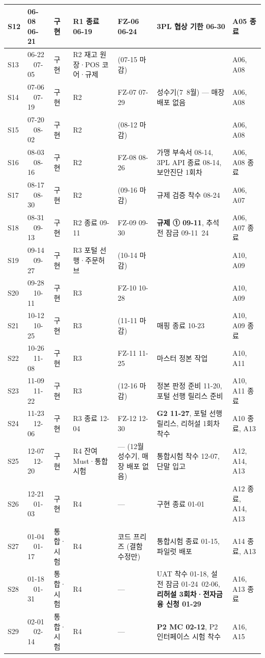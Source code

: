 \documentclass[10pt,a4paper]{article}
\begin{document}
{\begin{longtable}{|C{9mm}|L{24mm}|L{16mm}|L{44mm}|L{40mm}|L{76mm}|L{40mm}|}
S12 & 06-08 ~ 06-21 & 구현 & R1 종료 06-19 & FZ-06 06-24 & 3PL 협상 기한 06-30 & A05 종료 \\ \hline
S13 & 06-22 ~ 07-05 & 구현 & R2 재고 원장·POS 코어·규제 & (07-15 마감) & & A06, A08 \\ \hline
S14 & 07-06 ~ 07-19 & 구현 & R2 & FZ-07 07-29 & 성수기(7~8월) — 매장 배포 없음 & A06, A08 \\ \hline
S15 & 07-20 ~ 08-02 & 구현 & R2 & (08-12 마감) & & A06, A08 \\ \hline
S16 & 08-03 ~ 08-16 & 구현 & R2 & FZ-08 08-26 & 가맹 부속서 08-14, 3PL API 종료 08-14, 보안진단 1회차 & A06, A08 종료 \\ \hline
S17 & 08-17 ~ 08-30 & 구현 & R2 & (09-16 마감) & 규제 검증 착수 08-24 & A06, A07 \\ \hline
S18 & 08-31 ~ 09-13 & 구현 & R2 종료 09-11 & FZ-09 09-30 & \textbf{규제 ① 09-11}, 추석 전 잠금 09-11~24 & A06, A07 종료 \\ \hline
S19 & 09-14 ~ 09-27 & 구현 & R3 포털 선행·주문허브 & (10-14 마감) & & A10, A09 \\ \hline
S20 & 09-28 ~ 10-11 & 구현 & R3 & FZ-10 10-28 & & A10, A09 \\ \hline
S21 & 10-12 ~ 10-25 & 구현 & R3 & (11-11 마감) & 매핑 종료 10-23 & A10, A09 종료 \\ \hline
S22 & 10-26 ~ 11-08 & 구현 & R3 & FZ-11 11-25 & 마스터 정본 작업 & A10, A11 \\ \hline
S23 & 11-09 ~ 11-22 & 구현 & R3 & (12-16 마감) & 정본 판정 준비 11-20, 포털 선행 릴리스 준비 & A10, A11 종료 \\ \hline
S24 & 11-23 ~ 12-06 & 구현 & R3 종료 12-04 & FZ-12 12-30 & \textbf{G2 11-27}, 포털 선행 릴리스, 리허설 1회차 착수 & A10 종료, A13 \\ \hline
S25 & 12-07 ~ 12-20 & 구현 & R4 잔여 Must·통합시험 & — (12월 성수기, 매장 배포 없음) & 통합시험 착수 12-07, 단말 입고 & A12, A14, A13 \\ \hline
S26 & 12-21 ~ 01-03 & 구현 & R4 & — & 구현 종료 01-01 & A12 종료, A14, A13 \\ \hline
S27 & 01-04 ~ 01-17 & 통합·시험 & R4 & 코드 프리즈 (결함 수정만) & 통합시험 종료 01-15, 파일럿 배포 & A14 종료, A13 \\ \hline
S28 & 01-18 ~ 01-31 & 통합·시험 & R4 & — & UAT 착수 01-18, 설 전 잠금 01-24~02-06, \textbf{리허설 3회차·전자금융 신청 01-29} & A16, A13 종료 \\ \hline
S29 & 02-01 ~ 02-14 & 통합·시험 & R4 & — & \textbf{P2 MC 02-12}, P2 인터페이스 시험 착수 & A16, A15 \\ \hline

\end{longtable}}
\end{document}
